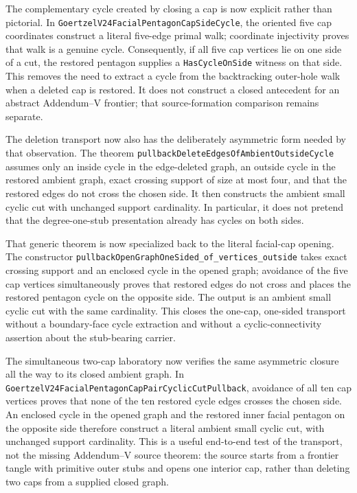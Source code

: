 \documentclass[11pt]{article}
\theoremstyle{definition}
\begin{document}
The complementary cycle created by closing a cap is now explicit rather
than pictorial.  In
\texttt{GoertzelV24FacialPentagonCapSideCycle}, the oriented five cap
coordinates construct a literal five-edge primal walk; coordinate
injectivity proves that walk is a genuine cycle.  Consequently, if all five
cap vertices lie on one side of a cut, the restored pentagon supplies a
\texttt{HasCycleOnSide} witness on that side.  This removes the need to
extract a cycle from the backtracking outer-hole walk when a deleted cap is
restored.  It does not construct a closed antecedent for an abstract
Addendum--V frontier; that source-formation comparison remains separate.

The deletion transport now also has the deliberately asymmetric form needed
by that observation.  The theorem
\texttt{pullbackDeleteEdgesOfAmbientOutsideCycle} assumes only an inside
cycle in the edge-deleted graph, an outside cycle in the restored ambient
graph, exact crossing support of size at most four, and that the restored
edges do not cross the chosen side.  It then constructs the ambient small
cyclic cut with unchanged support cardinality.  In particular, it does not
pretend that the degree-one-stub presentation already has cycles on both
sides.

That generic theorem is now specialized back to the literal facial-cap
opening.  The constructor
\texttt{pullbackOpenGraphOneSided\_of\_vertices\_outside} takes exact
crossing support and an enclosed cycle in the opened graph; avoidance of the
five cap vertices simultaneously proves that restored edges do not cross and
places the restored pentagon cycle on the opposite side.  The output is an
ambient small cyclic cut with the same cardinality.  This closes the
one-cap, one-sided transport without a boundary-face cycle extraction and
without a cyclic-connectivity assertion about the stub-bearing carrier.

The simultaneous two-cap laboratory now verifies the same asymmetric closure
all the way to its closed ambient graph.  In
\texttt{GoertzelV24FacialPentagonCapPairCyclicCutPullback}, avoidance of all
ten cap vertices proves that none of the ten restored cycle edges crosses the
chosen side.  An enclosed cycle in the opened graph and the restored inner
facial pentagon on the opposite side therefore construct a literal ambient
small cyclic cut, with unchanged support cardinality.  This is a useful
end-to-end test of the transport, not the missing Addendum--V source theorem:
the source starts from a frontier tangle with primitive outer stubs and opens
one interior cap, rather than deleting two caps from a supplied closed graph.
\end{document}
